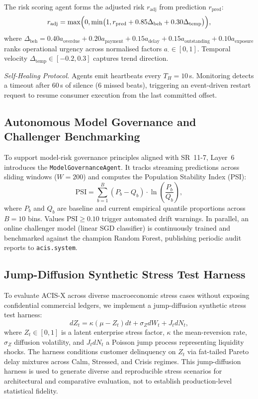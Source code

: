 \documentclass[conference]{IEEEtran}
\begin{document}
The risk scoring agent forms the adjusted risk $r_{\text{adj}}$ from prediction $r_{\text{pred}}$:
\begin{equation}
r_{\text{adj}}=\max\Bigl(0,\min\bigl(1,r_{\text{pred}}+0.85\Delta_{\text{beh}}+0.30\Delta_{\text{temp}}\bigr)\Bigr),
\label{eq:refinement}
\end{equation}
where $\Delta_{\text{beh}} = 0.40a_{\text{overdue}}+0.20a_{\text{payment}}+0.15a_{\text{delay}}+0.15a_{\text{outstanding}}+0.10a_{\text{exposure}}$ ranks operational urgency across normalised factors $a_{\cdot}\in[0,1]$. Temporal velocity $\Delta_{\text{temp}}\in[-0.2,0.3]$ captures trend direction.

\noindent\textit{Self-Healing Protocol.} Agents emit heartbeats every $T_H=10$\,s. Monitoring detects a timeout after 60\,s of silence (6 missed beats), triggering an event-driven restart request to resume consumer execution from the last committed offset.

\subsection{Autonomous Model Governance and Challenger Benchmarking}

To support model-risk governance principles aligned with SR~11-7, Layer~6 introduces the \texttt{ModelGovernanceAgent}. It tracks streaming predictions across sliding windows ($W=200$) and computes the Population Stability Index (PSI):
\begin{equation}
\text{PSI} = \sum_{b=1}^{B} (P_b - Q_b) \cdot \ln\left(\frac{P_b}{Q_b}\right),
\label{eq:psi}
\end{equation}
where $P_b$ and $Q_b$ are baseline and current empirical quantile proportions across $B=10$ bins. Values $\text{PSI} \ge 0.10$ trigger automated drift warnings. In parallel, an online challenger model (linear SGD classifier) is continuously trained and benchmarked against the champion Random Forest, publishing periodic audit reports to \texttt{acis.system}.

\subsection{Jump-Diffusion Synthetic Stress Test Harness}

To evaluate ACIS-X across diverse macroeconomic stress cases without exposing confidential commercial ledgers, we implement a jump-diffusion synthetic stress test harness:
\begin{equation}
dZ_t = \kappa (\mu - Z_t) dt + \sigma_Z dW_t + J_t dN_t,
\label{eq:jumpdiff}
\end{equation}
where $Z_t \in [0,1]$ is a latent enterprise stress factor, $\kappa$ the mean-reversion rate, $\sigma_Z$ diffusion volatility, and $J_t dN_t$ a Poisson jump process representing liquidity shocks. The harness conditions customer delinquency on $Z_t$ via fat-tailed Pareto delay mixtures across Calm, Stressed, and Crisis regimes. This jump-diffusion harness is used to generate diverse and reproducible stress scenarios for architectural and comparative evaluation, not to establish production-level statistical fidelity.
\end{document}
